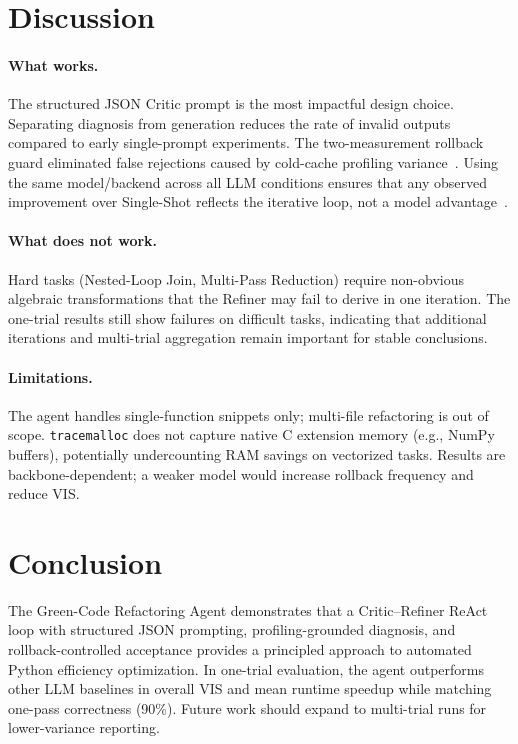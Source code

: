 \documentclass{article}
\begin{document}
\section{Discussion}

\paragraph{What works.}
The structured JSON Critic prompt is the most impactful design choice. Separating diagnosis from generation reduces the rate of invalid outputs compared to early single-prompt experiments. The two-measurement rollback guard eliminated false rejections caused by cold-cache profiling variance~\cite{update2}. Using the same model/backend across all LLM conditions ensures that any observed improvement over Single-Shot reflects the iterative loop, not a model advantage~\cite{update3}.

\paragraph{What does not work.}
Hard tasks (Nested-Loop Join, Multi-Pass Reduction) require non-obvious algebraic transformations that the Refiner may fail to derive in one iteration. The one-trial results still show failures on difficult tasks, indicating that additional iterations and multi-trial aggregation remain important for stable conclusions.

\paragraph{Limitations.}
The agent handles single-function snippets only; multi-file refactoring is out of scope. \texttt{tracemalloc} does not capture native C extension memory (e.g., NumPy buffers), potentially undercounting RAM savings on vectorized tasks. Results are backbone-dependent; a weaker model would increase rollback frequency and reduce VIS.

\section{Conclusion}

The Green-Code Refactoring Agent demonstrates that a Critic--Refiner ReAct loop with structured JSON prompting, profiling-grounded diagnosis, and rollback-controlled acceptance provides a principled approach to automated Python efficiency optimization. In one-trial evaluation, the agent outperforms other LLM baselines in overall VIS and mean runtime speedup while matching one-pass correctness (90\%). Future work should expand to multi-trial runs for lower-variance reporting.
\end{document}
